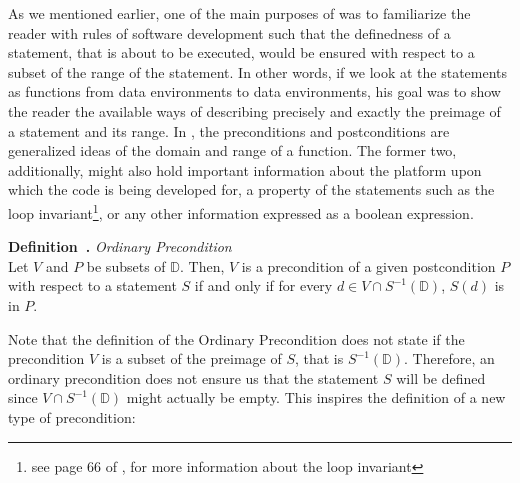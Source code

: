\documentclass[11pt]{article}
\newcounter{definition}
\newenvironment{definition}[1][]{\stepcounter{definition}\par\medskip\noindent
\textbf{Definition~\thesection.\thedefinition #1} \rmfamily}{}
\begin{document}
As we mentioned earlier, one of the main purposes of \cite{baber} was to familiarize the reader with rules of software development such that the definedness of a statement, that is about to be executed, would be ensured with respect to a subset of the range of the statement. In other words, if we look at the statements as functions from data environments to data environments, his goal was to show the reader the available ways of describing precisely and exactly the preimage of a statement and its range. In \cite{baber}, the preconditions and postconditions are generalized ideas of the domain and range of a function. The former two, additionally, might also hold important information about the platform upon which the code is being developed for, a property of the statements such as the loop invariant\footnote{see page 66 of \cite{baber}, for more information about the loop invariant}, or any other information expressed as a boolean expression.


\begin{definition} \emph{Ordinary Precondition} \\
Let $V$ and $P$ be subsets of $\mathbb{D}$. Then, $V$ is a precondition of a given postcondition $P$ with respect to a statement $S$ if and only if for every $d \in V \cap S^{-1}(\mathbb{D})$, $S(d)$ is in $P$.\medskip
\end{definition}

Note that the definition of the Ordinary Precondition does not state if the precondition $V$ is a subset of the preimage of $S$, that is $S^{-1}(\mathbb{D})$. Therefore, an ordinary precondition does not ensure us that the statement $S$ will be defined since $V\cap S^{-1}(\mathbb{D})$ might actually be empty. This inspires the definition of a new type of precondition:
\end{document}
